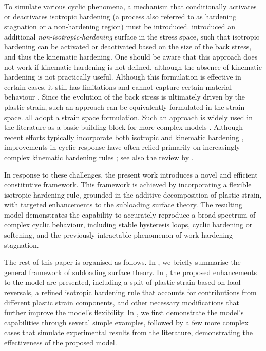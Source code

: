 To simulate various cyclic phenomena, a mechanism that conditionally activates or deactivates isotropic hardening (a process also referred to as hardening stagnation or a non-hardening region) must be introduced.
\citet[][see, \S~2.4]{Yoshida2002} introduced an additional \textit{non-isotropic-hardening} surface in the stress space, such that isotropic hardening can be activated or deactivated based on the size of the back stress, and thus the kinematic hardening.
One should be aware that this approach does not work if kinematic hardening is not defined, although the absence of kinematic hardening is not practically useful.
Although this formulation is effective in certain cases, it still has limitations and cannot capture certain material behaviour \citep{Meyer2023}.
Since the evolution of the back stress is ultimately driven by the plastic strain, such an approach can be equivalently formulated in the strain space.
\citet{Ohno1982,Chaboche2008,Hashiguchi2023a} all adopt a strain space formulation.
Such an approach is widely used in the literature as a basic building block for more complex models \citep[see, e.g.,][]{Xu2016,Xie2021,Zheng2026}.
Although recent efforts typically incorporate both isotropic and kinematic hardening \citep[e.g.,][]{Yang2023}, improvements in cyclic response have often relied primarily on increasingly complex kinematic hardening rules \citep[e.g.,][]{Ohno1993}; see also the review by \citet{Kang2008}.

In response to these challenges, the present work introduces a novel and efficient constitutive framework.
This framework is achieved by incorporating a flexible isotropic hardening rule, grounded in the additive decomposition of plastic strain, with targeted enhancements to the subloading surface theory.
The resulting model demonstrates the capability to accurately reproduce a broad spectrum of complex cyclic behaviour, including stable hysteresis loops, cyclic hardening or softening, and the previously intractable phenomenon of work hardening stagnation.


The rest of this paper is organised as follows.
In , we briefly summarise the general framework of subloading surface theory.
In , the proposed enhancements to the model are presented, including a split of plastic strain based on load reversals, a refined isotropic hardening rule that accounts for contributions from different plastic strain components, and other necessary modifications that further improve the model's flexibility.
In , we first demonstrate the model's capabilities through several simple examples, followed by a few more complex cases that simulate experimental results from the literature, demonstrating the effectiveness of the proposed model.
